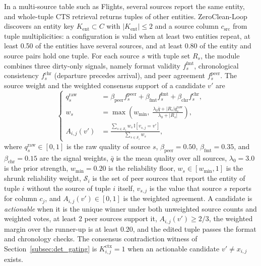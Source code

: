 \documentclass[conference]{IEEEtran}
\begin{document}
In a multi-source table such as Flights, several sources report the same entity, and whole-tuple CTS retrieval returns tuples of other entities. ZeroClean-Loop discovers an entity key $K_{\mathrm{ent}} \subset C$ with $|K_{\mathrm{ent}}| \le 2$ and a source column $c_{\mathrm{src}}$ from tuple multiplicities: a configuration is valid when at least two entities repeat, at least 0.50 of the entities have several sources, and at least 0.80 of the entity and source pairs hold one tuple. For each source $s$ with tuple set $R_s$, the module combines three dirty-only signals, namely format validity $f_s^{\mathrm{fmt}}$, chronological consistency $f_s^{\mathrm{chr}}$ (departure precedes arrival), and peer agreement $f_s^{\mathrm{peer}}$. The source weight and the weighted consensus support of a candidate $v'$ are
\begin{equation}
\label{eq:source_consensus}
\left\{
\begin{aligned}
q_s^{\mathrm{raw}} &= \beta_{\mathrm{peer}} f_s^{\mathrm{peer}} + \beta_{\mathrm{fmt}} f_s^{\mathrm{fmt}} + \beta_{\mathrm{chr}} f_s^{\mathrm{chr}}, \\
w_s &= \max\!\left(w_{\min},\; \frac{\lambda_0 \bar{q} + |R_s| q_s^{\mathrm{raw}}}{\lambda_0 + |R_s|}\right), \\
A_{i,j}(v') &= \frac{\sum_{s \in \mathcal{S}_{i}} w_s \,\mathbb{I}\!\left[v_{s,j} = v'\right]}{\sum_{s \in \mathcal{S}_{i}} w_s},
\end{aligned}
\right.
\end{equation}
where $q_s^{\mathrm{raw}} \in [0,1]$ is the raw quality of source $s$, $\beta_{\mathrm{peer}} = 0.50$, $\beta_{\mathrm{fmt}} = 0.35$, and $\beta_{\mathrm{chr}} = 0.15$ are the signal weights, $\bar{q}$ is the mean quality over all sources, $\lambda_0 = 3.0$ is the prior strength, $w_{\min} = 0.20$ is the reliability floor, $w_s \in [w_{\min}, 1]$ is the shrunk reliability weight, $\mathcal{S}_{i}$ is the set of peer sources that report the entity of tuple $i$ without the source of tuple $i$ itself, $v_{s,j}$ is the value that source $s$ reports for column $c_j$, and $A_{i,j}(v') \in [0,1]$ is the weighted agreement. A candidate is \emph{actionable} when it is the unique winner under both unweighted source counts and weighted votes, at least 2 peer sources support it, $A_{i,j}(v') \ge 2/3$, the weighted margin over the runner-up is at least 0.20, and the edited tuple passes the format and chronology checks. The consensus contradiction witness of Section~\ref{subsec:det_gating} is $K_{i,j}^{\mathrm{ctx}} = 1$ when an actionable candidate $v' \neq x_{i,j}$ exists.
\end{document}
